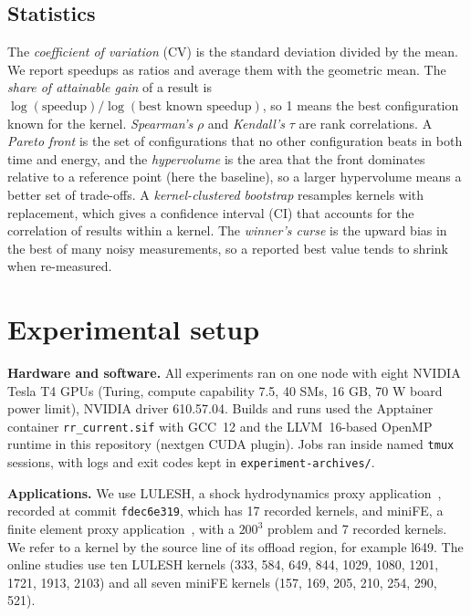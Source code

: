 \documentclass[10pt]{article}
\newcommand{\code}[1]{\texttt{#1}}
\begin{document}
\subsection{Statistics}
The \emph{coefficient of variation} (CV) is the standard deviation divided by
the mean. We report speedups as ratios and average them with the geometric
mean. The \emph{share of attainable gain} of a result is
$\log(\text{speedup}) / \log(\text{best known speedup})$, so 1 means the best
configuration known for the kernel. \emph{Spearman's} $\rho$ and
\emph{Kendall's} $\tau$ are rank correlations. A \emph{Pareto front} is the
set of configurations that no other configuration beats in both time and
energy, and the \emph{hypervolume} is the area that the front dominates
relative to a reference point (here the baseline), so a larger hypervolume
means a better set of trade-offs. A \emph{kernel-clustered bootstrap}
resamples kernels with replacement, which gives a confidence interval (CI)
that accounts for the correlation of results within a kernel. The
\emph{winner's curse} is the upward bias in the best of many noisy
measurements, so a reported best value tends to shrink when re-measured.

\section{Experimental setup}
\label{sec:setup}

\textbf{Hardware and software.} All experiments ran on one node with eight
NVIDIA Tesla T4 GPUs (Turing, compute capability 7.5, 40 SMs, 16 GB, 70 W
board power limit), NVIDIA driver 610.57.04. Builds and runs used the
Apptainer container \code{rr\_current.sif} with GCC~12 and the LLVM~16-based
OpenMP runtime in this repository (nextgen CUDA plugin). Jobs ran inside named
\code{tmux} sessions, with logs and exit codes kept in
\code{experiment-archives/}.

\textbf{Applications.} We use LULESH, a shock hydrodynamics proxy
application~\cite{karlin2013lulesh}, recorded at commit \code{fdec6e319},
which has 17 recorded kernels, and miniFE, a finite element proxy
application~\cite{heroux2009mantevo}, with a $200^3$ problem and 7 recorded
kernels. We refer to a kernel by the source line of its offload region, for
example l649. The online studies use ten LULESH kernels (333, 584, 649, 844,
1029, 1080, 1201, 1721, 1913, 2103) and all seven miniFE kernels (157, 169,
205, 210, 254, 290, 521).
\end{document}
